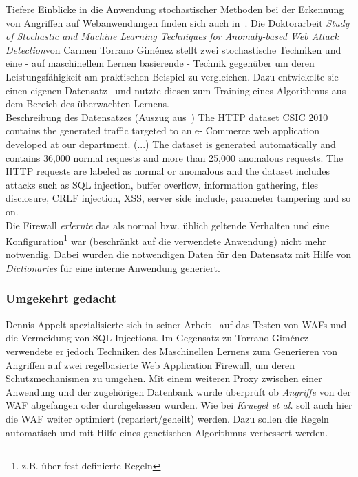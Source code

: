 Tiefere Einblicke in die Anwendung stochastischer Methoden bei der Erkennung von Angriffen auf Webanwendungen finden sich auch in~\cite{Giménez2015}. Die Doktorarbeit \glqq\emph{Study of Stochastic and Machine Learning Techniques for Anomaly-based Web Attack Detection}\grqq von Carmen Torrano Giménez stellt zwei stochastische Techniken und eine - auf maschinellem Lernen basierende - Technik gegenüber um deren Leistungsfähigkeit am praktischen Beispiel zu vergleichen. Dazu entwickelte sie einen eigenen Datensatz~\cite{csic2010} und nutzte diesen zum Training eines Algorithmus aus dem Bereich des überwachten Lernens.\\

\textcolor{bhtGray}{ Beschreibung des Datensatzes (Auszug aus~\cite{csic2010})} The HTTP dataset CSIC 2010 contains the generated traffic targeted to an e- Commerce web application developed at our department. (...) The dataset is generated automatically and contains 36,000 normal requests and more than 25,000 anomalous requests. The HTTP requests are labeled as normal or anomalous and the dataset includes attacks such as SQL injection, buffer overflow, information gathering, files disclosure, CRLF injection, XSS, server side include, parameter tampering and so on.\\

Die Firewall \emph{erlernte} das als normal bzw. üblich geltende Verhalten und eine Konfiguration\footnote{z.B. über fest definierte Regeln} war (beschränkt auf die verwendete Anwendung) nicht mehr notwendig. Dabei wurden die notwendigen Daten für den Datensatz mit Hilfe von \emph{Dictionaries} für eine interne Anwendung generiert. 


\subsubsection{Umgekehrt gedacht}

Dennis Appelt spezialisierte sich in seiner Arbeit~\cite{Appelt2016} auf das Testen von WAFs und die Vermeidung von SQL-Injections. Im Gegensatz zu Torrano-Giménez verwendete er jedoch Techniken des Maschinellen Lernens zum Generieren von Angriffen auf zwei regelbasierte Web Application Firewall, um deren Schutzmechanismen zu umgehen. Mit einem weiteren Proxy zwischen einer Anwendung und der zugehörigen Datenbank wurde überprüft ob \emph{Angriffe} von der WAF abgefangen oder durchgelassen wurden. Wie bei \emph{Kruegel et al.} soll auch hier die WAF weiter optimiert (repariert/geheilt) werden. Dazu sollen die Regeln automatisch und mit Hilfe eines genetischen Algorithmus verbessert werden.

